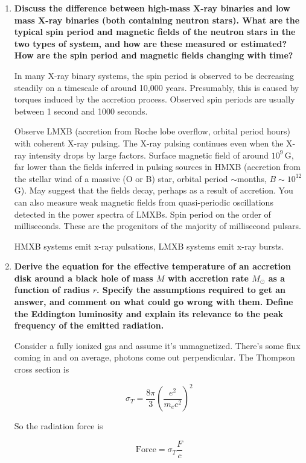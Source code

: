 \documentclass[12pt, letterpaper, preprint]{aastex}
\begin{document}
\begin{enumerate}
\item \textbf{Discuss the difference between high-mass X-ray binaries and low mass X-ray binaries (both containing neutron stars). What are the typical spin period and magnetic fields of the neutron stars in the two types of system, and how are these measured or estimated? How are the spin period and magnetic fields changing with time?}

In many X-ray binary systems, the spin period is observed to be decreasing steadily on a timescale of around 10,000 years. Presumably, this is caused by torques induced by the accretion process. Observed spin periods are usually between 1 second and 1000 seconds. 

Observe LMXB (accretion from Roche lobe overflow, orbital period hours) with coherent X-ray pulsing. The X-ray pulsing continues even when the X-ray intensity drops by large factors. Surface magnetic field of around $10^9$\,G, far lower than the fields inferred in pulsing sources in HMXB (accretion from the stellar wind of a massive (O or B) star, orbital period $\sim$months, $B \sim 10^{12}$\,G). May suggest that the fields decay, perhaps as a result of accretion. You can also measure weak magnetic fields from quasi-periodic oscillations detected in the power spectra of LMXBs. Spin period on the order of milliseconds. These are the progenitors of the majority of millisecond pulsars. 

HMXB systems emit x-ray pulsations, LMXB systems emit x-ray bursts.

\item \textbf{Derive the equation for the effective temperature of an
accretion disk around a black hole of mass $M$ with accretion rate
$M_\odot$ as a function of radius $r$. Specify the assumptions
required to get an answer, and comment on what could go wrong with them.
Define the Eddington luminosity and explain its relevance to the peak
frequency of the emitted radiation.}

Consider a fully ionized gas and assume it's unmagnetized. There's some flux coming in and on average, photons come out perpendicular. The Thompson cross section is

\begin{equation}
\sigma_T = \frac{8 \pi}{3} \left( \frac{e^2}{m_e c^2} \right)^2
\end{equation}

So the radiation force is

\begin{equation}
\mathrm{Force} = \sigma_T \frac{F}{c}
\end{equation}


\end{enumerate}
\end{document}
